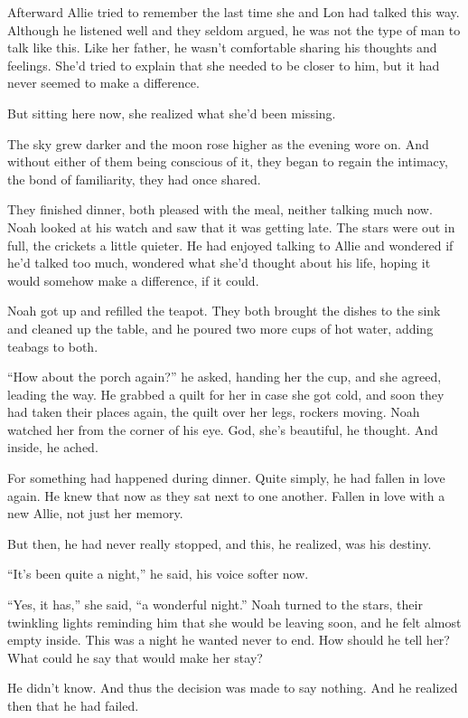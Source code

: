 \documentclass[10pt, twoside, openright]{book}
\begin{document}
Afterward Allie tried to remember the last time she and Lon had talked
this way. Although he listened well and they seldom argued, he was not
the type of man to talk like this. Like her father, he wasn't
comfortable sharing his thoughts and feelings. She'd tried to explain
that she needed to be closer to him, but it had never seemed to make a
difference.


But sitting here now, she realized what she'd been missing.


The sky grew darker and the moon rose higher as the evening wore on. And
without either of them being conscious of it, they began to regain the
intimacy, the bond of familiarity, they had once shared.

They finished dinner, both pleased with the meal, neither talking much
now. Noah looked at his watch and saw that it was getting late. The
stars were out in full, the crickets a little quieter. He had enjoyed
talking to Allie and wondered if he'd talked too much, wondered what
she'd thought about his life, hoping it would somehow make a difference,
if it could.

Noah got up and refilled the teapot. They both brought the dishes to the
sink and cleaned up the table, and he poured two more cups of hot water,
adding teabags to both.

``How about the porch again?'' he asked, handing her the cup, and she
agreed, leading the way. He grabbed a quilt for her in case she got
cold, and soon they had taken their places again, the quilt over her
legs, rockers moving. Noah watched her from the corner of his eye. God,
she's beautiful, he thought. And inside, he ached.

For something had happened during dinner. Quite simply, he had fallen in
love again. He knew that now as they sat next to one another. Fallen in
love with a new Allie, not just her memory.

But then, he had never really stopped, and this, he realized, was his
destiny.


``It's been quite a night,'' he said, his voice softer now.


``Yes, it has,'' she said, ``a wonderful night.'' Noah turned to the
stars, their twinkling lights reminding him that she would be leaving
soon, and he felt almost empty inside. This was a night he wanted never
to end. How should he tell her? What could he say that would make her
stay?

He didn't know. And thus the decision was made to say nothing. And he
realized then that he had failed.
\end{document}
